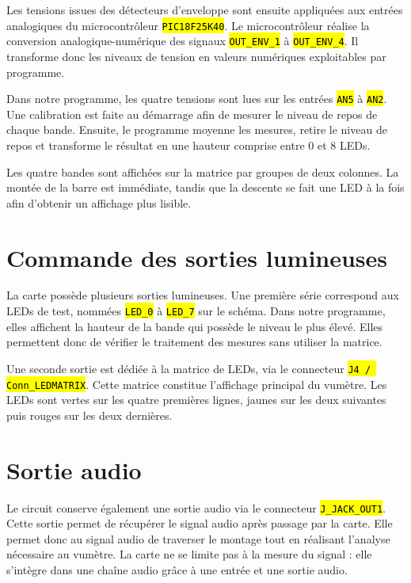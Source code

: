 \documentclass{report}
\let\OldTexttt\texttt
\renewcommand{\texttt}[1]{\OldTexttt{\hl{#1}}}
\begin{document}
Les tensions issues des détecteurs d'enveloppe sont ensuite appliquées aux entrées analogiques du microcontrôleur \texttt{PIC18F25K40}. Le microcontrôleur réalise la conversion analogique-numérique des signaux \texttt{OUT\_ENV\_1} à \texttt{OUT\_ENV\_4}. Il transforme donc les niveaux de tension en valeurs numériques exploitables par programme.

Dans notre programme, les quatre tensions sont lues sur les entrées \texttt{AN5} à \texttt{AN2}. Une calibration est faite au démarrage afin de mesurer le niveau de repos de chaque bande. Ensuite, le programme moyenne les mesures, retire le niveau de repos et transforme le résultat en une hauteur comprise entre 0 et 8 LEDs.

Les quatre bandes sont affichées sur la matrice par groupes de deux colonnes. La montée de la barre est immédiate, tandis que la descente se fait une LED à la fois afin d'obtenir un affichage plus lisible.

\section{Commande des sorties lumineuses}

La carte possède plusieurs sorties lumineuses. Une première série correspond aux LEDs de test, nommées \texttt{LED\_0} à \texttt{LED\_7} sur le schéma. Dans notre programme, elles affichent la hauteur de la bande qui possède le niveau le plus élevé. Elles permettent donc de vérifier le traitement des mesures sans utiliser la matrice.

Une seconde sortie est dédiée à la matrice de LEDs, via le connecteur \texttt{J4 / Conn\_LEDMATRIX}. Cette matrice constitue l'affichage principal du vumètre. Les LEDs sont vertes sur les quatre premières lignes, jaunes sur les deux suivantes puis rouges sur les deux dernières.

\section{Sortie audio}

Le circuit conserve également une sortie audio via le connecteur \texttt{J\_JACK\_OUT1}. Cette sortie permet de récupérer le signal audio après passage par la carte. Elle permet donc au signal audio de traverser le montage tout en réalisant l'analyse nécessaire au vumètre. La carte ne se limite pas à la mesure du signal : elle s'intègre dans une chaîne audio grâce à une entrée et une sortie audio.
\end{document}
